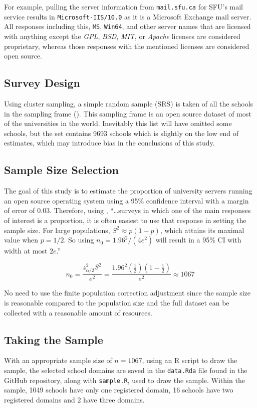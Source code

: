 \documentclass{article}
\theoremstyle{definition}
\begin{document}
\begin{flushleft}
\begin{multicols}{2}
For example, pulling the server information from \texttt{mail.sfu.ca} for
SFU's mail service results in \texttt{Microsoft-IIS/10.0} as it is a
Microsoft Exchange mail server. All responses including this, \texttt{MS},
\texttt{Win64}, and other server names that are licensed with anything
except the \textit{GPL}, \textit{BSD}, \textit{MIT}, or \textit{Apache}
licenses are considered proprietary, whereas those responses with
the mentioned licenses are considered open source.

\subsection{Survey Design}

Using cluster
sampling, a simple random sample (SRS) is taken of all the schools in the sampling
frame (\cite{Hipo}). This sampling frame is an open source dataset
of most of the universities in the world. Inevitably
this list will have omitted some schools, but the set
contains 9693 schools which is slightly on the low
end of estimates, which may introduce bias in the
conclusions of this study.

\subsection{Sample Size Selection}
The goal of this study is
to estimate the proportion of university servers
running an open source operating system using a 95\% confidence
interval with a margin of error of 0.03.
Therefore, using
\cite{lohr2019},
``\dots surveys in which one of the main responses of interest
is a proportion, it is often easiest to use that response
in setting the sample size.
For large populations, $S^2 \approx p(1-p)$, which
attains its maximal value when $p=1/2$. So using
$n_0=1.96^2/(4e^2)$ will result in a 95\% CI with width at most
$2e$.''

$$
	n_0
	=
	\frac{
		z^2_{\alpha/2}S^2
	}{
		e^2
	}
	=
	\frac{
		1.96^2(\frac{1}{2})(1-\frac{1}{2})
	}{
		e^2
	}
	\approx
	1067
$$

No need to use the finite population correction adjustment
since the sample size
is reasonable compared to the population size and the full
dataset can be collected with a reasonable amount of resources.

\subsection{Taking the Sample}
With an appropriate sample size of $n=1067$,
using an R script to
draw the sample, the selected school domains
are saved in the \texttt{data.Rda} file found
in the GitHub repository, along with \texttt{sample.R},
used to draw the sample.
Within the sample, 1049 schools have only
one registered domain, 16 schools have two
registered domains and 2 have three
domains.


\end{multicols}
\end{flushleft}
\end{document}
